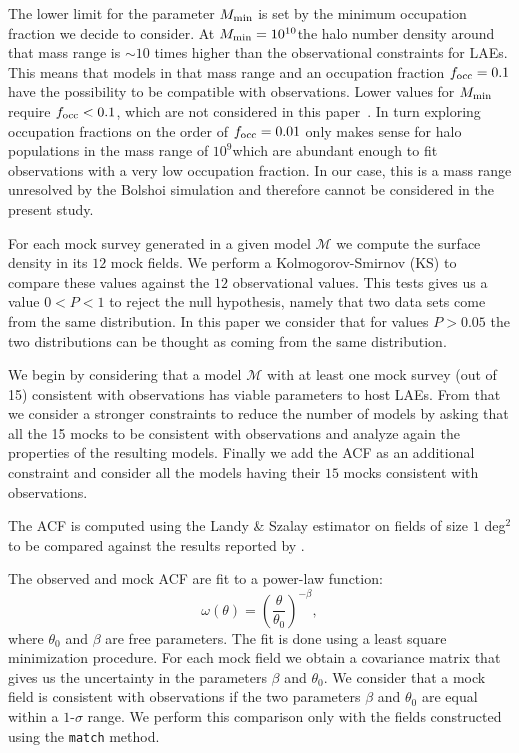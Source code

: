 \documentclass{emulateapj}
\newcommand{\documentname}{paper~}
\newcommand{\hMsun}{{\ifmmode{h^{-1}{\rm
        {M_{\odot}}}}\else{$h^{-1}{\rm{M_{\odot}}}$}\fi}}
\begin{document}
The lower limit for the parameter $M_{\rm min}$ is set by the minimum
occupation fraction we decide to consider. At $M_{\rm
  min}=10^{10}$\hMsun the halo number density around that mass range
is $\sim 10$ times higher than the observational constraints
for LAEs. This means that models in that mass range and an occupation fraction $f_{\rm  occ}=0.1$ have the possibility to be compatible with
observations. Lower values for $M_{\rm min}$ require $f_{\rm
  occ}<0.1$, which are not considered in this \documentname.  In
  turn exploring occupation fractions on the order of $f_{\rm occ}=0.01$ 
  only makes sense for halo populations in the mass range of
  $10^{9}$\hMsun which are abundant enough to fit observations with a
  very low occupation fraction. In our case, this is a mass range unresolved
  by the Bolshoi simulation and therefore cannot be considered in the
  present study.

For each mock survey generated in a given model ${\mathcal M}$ we
compute the surface density in its $12$ mock fields. We perform a
Kolmogorov-Smirnov (KS) to compare these values against the $12$
observational values. This tests gives us a value $0<P<1$ to
reject the null hypothesis, namely that two data sets come from the
same distribution. In this paper we consider that for values $P>0.05$
the two distributions can be thought as coming from the same
distribution.

We begin by considering that  a model ${\mathcal M}$ with at least one
mock survey (out of 15) consistent with observations has viable
parameters to host LAEs. From that we consider a stronger constraints
to reduce the number of models by asking that all the 15 mocks  to be
consistent with observations and analyze again the properties of the
resulting models. Finally we add the ACF as an additional constraint
and consider all the models having their $15$ mocks consistent with
observations. 

The ACF is computed using  the Landy \&  Szalay estimator
  \citep{Landy1993}  on fields of size $1$ deg$^2$ to be compared
  against the results reported by \cite{Ouchi2010}.

The observed and mock ACF are fit to a power-law function:
\begin{equation}
\omega(\theta) = \left(\frac{\theta}{\theta_{0}}\right)^{-\beta}, 
\label{eq:fitting}
\end{equation}
where $\theta_0$ and $\beta$ are free parameters. The fit is done
using a least square minimization procedure. For each mock field we
obtain a covariance matrix that gives us the uncertainty in the
parameters $\beta$ and $\theta_0$.  We consider that a mock field is
consistent with observations if the two parameters $\beta$ and
$\theta_0$ are equal within a $1$-$\sigma$ range. We perform this
comparison only with the fields constructed using the {\texttt{match}}
method.
 
\end{document}
